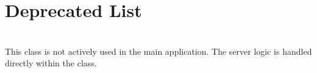 \chapter{Deprecated List}
\hypertarget{deprecated}{}\label{deprecated}

\begin{DoxyRefList}
\item[Class \doxylink{classcom_1_1example_1_1mailserver_1_1network_1_1_multi_threaded_server}{com.example.mailserver.network.Multi\+Threaded\+Server} ]\hfill \\
\label{deprecated__deprecated000001}%
%
This class is not actively used in the main application. The server logic is handled directly within the {\ttfamily {}} class. 
\end{DoxyRefList}